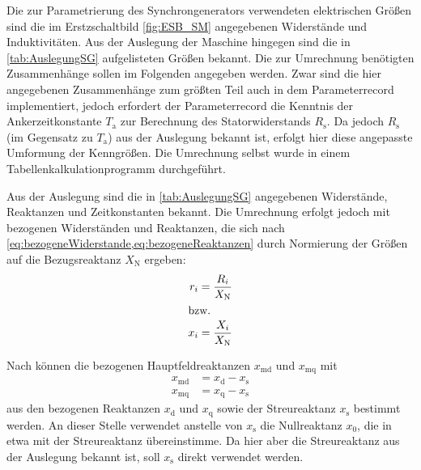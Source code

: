 Die zur Parametrierung des Synchrongenerators verwendeten elektrischen Größen sind die im Erstzschaltbild \cref{fig:ESB_SM} angegebenen Widerstände und Induktivitäten. Aus der Auslegung der Maschine hingegen sind die in \cref{tab:AuslegungSG} aufgelisteten Größen bekannt. Die zur Umrechnung benötigten Zusammenhänge sollen im Folgenden angegeben werden. Zwar sind die hier angegebenen Zusammenhänge zum größten Teil auch in dem Parameterrecord  implementiert, jedoch erfordert der Parameterrecord die Kenntnis der Ankerzeitkonstante \(T_{\mathrm{a}}\) zur Berechnung des Statorwiderstands \(R_{\mathrm{s}}\). Da jedoch \(R_{\mathrm{s}}\) (im Gegensatz zu \(T_{\mathrm{a}}\)) aus der Auslegung bekannt ist, erfolgt hier diese angepasste Umformung der Kenngrößen. Die Umrechnung selbst wurde in einem Tabellenkalkulationprogramm durchgeführt.

Aus der Auslegung sind die in \cref{tab:AuslegungSG} angegebenen Widerstände, Reaktanzen und Zeitkonstanten bekannt. Die Umrechnung erfolgt jedoch mit bezogenen Widerständen und Reaktanzen, die sich nach \cref{eq:bezogeneWiderstande,eq:bezogeneReaktanzen} durch Normierung der Größen auf die Bezugsreaktanz $X_{\mathrm{N}}$ ergeben:
\begin{align}
	r_i &= \frac{R_{i}}{X_{\mathrm{N}}} \label{eq:bezogeneWiderstande} \\
	\intertext{bzw.}
	x_i &= \frac{X_{i}}{X_{\mathrm{N}}} \label{eq:bezogeneReaktanzen}
\end{align}

Nach \cite[S. 264]{kralModelicaObjektorientierteModellbildung2019} können die bezogenen Hauptfeldreaktanzen \(x_{\mathrm{md}}\) und \(x_{\mathrm{mq}}\) mit
\begin{align}
    x_{\mathrm{md}} &= x_{\mathrm{d}} - x_{\mathrm{s}} \\
    x_{\mathrm{mq}} &= x_{\mathrm{q}} - x_{\mathrm{s}}
\end{align}
aus den bezogenen Reaktanzen \(x_{\mathrm{d}}\) und \(x_{\mathrm{q}}\) sowie der Streureaktanz \(x_{\mathrm{s}}\) bestimmt werden. An dieser Stelle verwendet \cite[]{kralModelicaObjektorientierteModellbildung2019} anstelle von \(x_{\mathrm{s}}\) die Nullreaktanz \(x_{\mathrm{0}}\), die in etwa mit der Streureaktanz übereinstimme. Da hier aber die Streureaktanz aus der Auslegung bekannt ist, soll \(x_{\mathrm{s}}\) direkt verwendet werden. 

